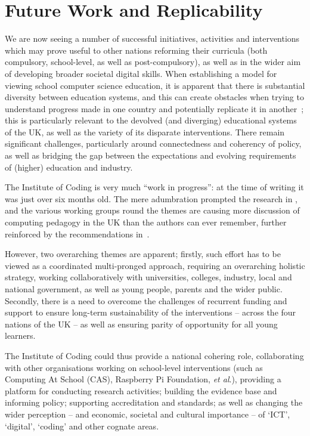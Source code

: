 \documentclass[sigconf,anonymous]{acmart}
\begin{document}
\section{Future Work and Replicability}\label{concl}

We are now seeing a number of successful initiatives, activities and
interventions which may prove useful to other nations reforming their
curricula (both compulsory, school-level, as well as post-compulsory),
as well as in the wider aim of developing broader societal digital
skills. When establishing a model for viewing school computer science
education, it is apparent that there is substantial diversity between
education systems, and this can create obstacles when trying to
understand progress made in one country and potentially replicate it
in another~\cite{hubwieser:2013}; this is particularly relevant to the
devolved (and diverging) educational systems of the UK, as well as the
variety of its disparate interventions. There remain significant
challenges, particularly around connectedness and coherency of policy,
as well as bridging the gap between the expectations and evolving
requirements of (higher) education and industry.

The Institute of Coding is very much ``work in progress'': at the time
of writing it was just over six months old.  The mere adumbration
\cite{HMG2015a} prompted the research in
\cite{murphy-et-al:programming2017}, and the various working groups
round the themes are causing more discussion of computing pedagogy in
the UK than the authors can ever remember, further reinforced by the
recommendations in~\cite{rs:2017}.

However, two overarching themes are apparent; firstly, such effort has
to be viewed as a coordinated multi-pronged approach, requiring an
overarching holistic strategy, working collaboratively with
universities, colleges, industry, local and national government, as
well as young people, parents and the wider public. Secondly, there is
a need to overcome the challenges of recurrent funding and support to
ensure long-term sustainability of the interventions -- across the
four nations of the UK -- as well as ensuring parity of opportunity
for all young learners.

The Institute of Coding could thus provide a national cohering role,
collaborating with other organisations working on school-level
interventions (such as Computing At School (CAS), Raspberry Pi
Foundation, {\it et al\/}.), providing a platform for conducting research
activities; building the evidence base and informing policy;
supporting accreditation and standards; as well as changing the wider
perception -- and economic, societal and cultural importance -- of
`ICT', `digital', `coding' and other cognate areas.
\end{document}
